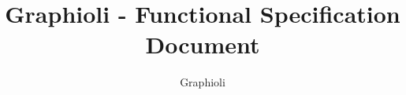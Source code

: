 \documentclass[a4paper]{scrartcl}
\author{Graphioli}
\title{Graphioli - Functional Specification Document}
\begin{document}
	
\setcounter{tocdepth}{5}
\setcounter{secnumdepth}{5}


\tableofcontents
\clearpage

\makeatletter
    \newcommand*{\textlabel}[2]{%
        \edef\@currentlabel{#1}%
        \phantomsection%
        #1\label{#2}%
    }
\makeatother

\newcommand{\graphioli}{\textsc{Graphioli}\xspace}
\newcommand{\twixt}{\textsc {TwixT}\xspace}
\newcommand{\graphcoloring}{\textsc {Graph-Coloring}\xspace}















\end{document}
